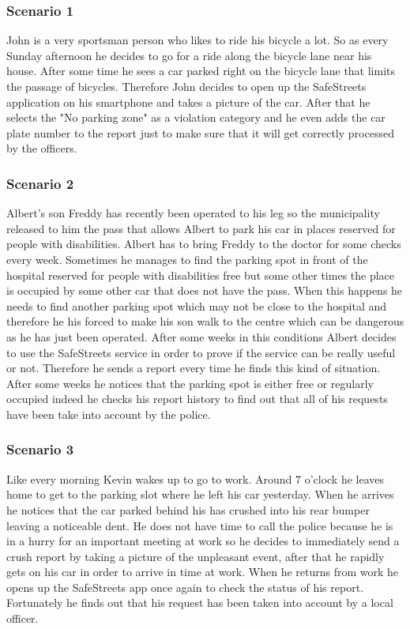 \subsubsection{Scenario 1}
John is a very sportsman person who likes to ride his bicycle a lot. So as every Sunday afternoon he decides to go for a ride along the bicycle lane near his house. After some time he sees a car parked right on the bicycle lane that limits the passage of bicycles. Therefore John decides to open up the SafeStreets application on his smartphone and takes a picture of the car. After that he selects the "No parking zone" as a violation category and he even adds the car plate number to the report just to make sure that it will get correctly processed by the officers. 

\subsubsection{Scenario 2}
Albert's son Freddy has recently been operated to his leg so the municipality released to him the pass that allows Albert to park his car in places reserved for people with disabilities. Albert has to bring Freddy to the doctor for some checks every week. Sometimes he manages to find the parking spot in front of the hospital reserved for people with disabilities free but some other times the place is occupied by some other car that does not have the pass. When this happens he needs to find another parking spot which may not be close to the hospital and therefore he his forced to make his son walk to the centre which can be dangerous as he has just been operated. After some weeks in this conditions Albert decides to use the SafeStreets service in order to prove if the service can be really useful or not. Therefore he sends a report every time he finds this kind of situation. After some weeks he notices that the parking spot is either free or regularly occupied indeed he checks his report history to find out that all of his requests have been take into account by the police.

\subsubsection{Scenario 3}
Like every morning Kevin wakes up to go to work. Around 7 o'clock he leaves home to get to the parking slot where he left his car yesterday. When he arrives he notices that the car parked behind his has crushed into his rear bumper leaving a noticeable dent. He does not have time to call the police because he is in a hurry for an important meeting at work so he decides to immediately send a crush report by taking a picture of the unpleasant event, after that he rapidly gets on his car in order to arrive in time at work. When he returns from work he opens up the SafeStreets app once again to check the status of his report. Fortunately he finds out that his request has been taken into account by a local officer.

